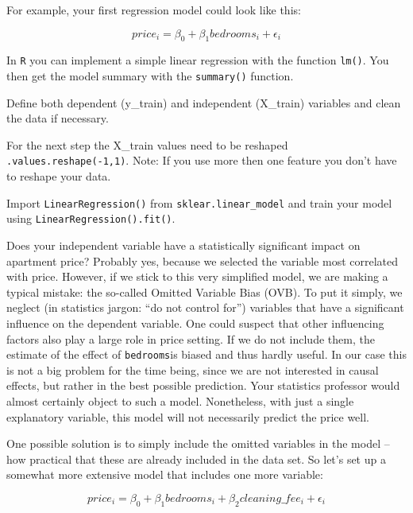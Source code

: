 \documentclass[
  11pt,
]{article}
\newenvironment{tips}[1]
  {
  \begin{itemize}
  \footnotesize
  \renewcommand{\labelitemi}{
    \raisebox{-.7\height}[0pt][0pt]{
      {\setkeys{Gin}{width=3em,keepaspectratio}
        \texttt{[image: images/\#1.png]}}
    }
  }
  \setlength{\fboxsep}{1em}
  \begin{rbox}
  \item
  }
  {
  \end{rbox}
  \end{itemize}
  }
\newenvironment{tipsp}[1]
  {
  \begin{itemize}
  \footnotesize
  \renewcommand{\labelitemi}{
    \raisebox{-.7\height}[0pt][0pt]{
      {\setkeys{Gin}{width=3em,keepaspectratio}
        \texttt{[image: images/\#1.png]}}
    }
  }
  \setlength{\fboxsep}{1em}
  \begin{pbox}
  \item
  }
  {
  \end{pbox}
  \end{itemize}
  }
\begin{document}
For example, your first regression model could look like this:

\[price_i = \beta_0 + \beta_1 bedrooms_i + \epsilon_i\]

\begin{tips}r
In \texttt{R} you can implement a simple linear regression with the function \texttt{lm()}. You then get the model summary with the \texttt{summary()} function.

\end{tips}

\begin{tipsp}p
Define both dependent (y\_train) and independent (X\_train) variables and clean the data if necessary.

For the next step the X\_train values need to be reshaped \texttt{.values.reshape(-1,1)}.
Note: If you use more then one feature you don't have to reshape your data.

Import \texttt{LinearRegression()} from \texttt{sklear.linear\_model} and train your model using \texttt{LinearRegression().fit()}.

\end{tipsp}

Does your independent variable have a statistically significant impact on apartment price? Probably yes, because we selected the variable most correlated with price. However, if we stick to this very simplified model, we are making a typical mistake: the so-called Omitted Variable Bias (OVB). To put it simply, we neglect (in statistics jargon: ``do not control for'') variables that have a significant influence on the dependent variable. One could suspect that other influencing factors also play a large role in price setting. If we do not include them, the estimate of the effect of \texttt{bedrooms}is biased and thus hardly useful. In our case this is not a big problem for the time being, since we are not interested in causal effects, but rather in the best possible prediction. Your statistics professor would almost certainly object to such a model. Nonetheless, with just a single explanatory variable, this model will not necessarily predict the price well.

One possible solution is to simply include the omitted variables in the model -- how practical that these are already included in the data set. So let's set up a somewhat more extensive model that includes one more variable:

\[price_i = \beta_0 + \beta_1 bedrooms_i + \beta_2 cleaning\_fee_i + \epsilon_i\]
\end{document}
